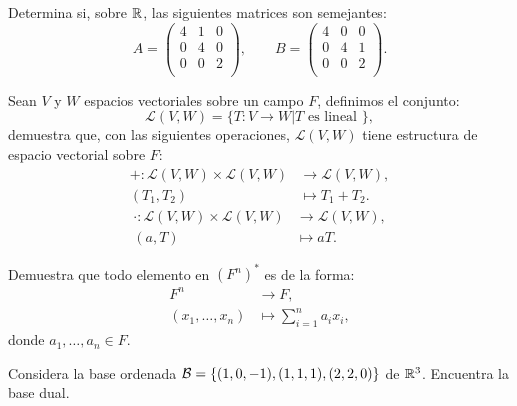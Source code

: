 \documentclass[12pt,a4paper]{book}
\newcommand{\llaves}[1]{\{#1\}}
\begin{document}
    \begin{ejercicio}
        Determina si, sobre $\mathbb{R}$, las siguientes matrices son semejantes:
        \[
        A = 
        \begin{pmatrix}
            4 & 1 & 0\\
            0 & 4 & 0\\
            0 & 0 & 2\\
        \end{pmatrix},
        \qquad
        B =
        \begin{pmatrix}
            4 & 0 & 0\\
            0 & 4 & 1\\
            0 & 0 & 2\\
        \end{pmatrix}.
        \]
    \end{ejercicio}

    \begin{ejercicio}
        Sean $V$ y $W$ espacios vectoriales sobre un campo $F$, definimos el conjunto:
        \[
        \mathcal{L}(V, W) = \llaves{T: V \to W | T \text{ es lineal }},
        \]
        demuestra que, con las siguientes operaciones, $\mathcal{L}(V, W)$ tiene estructura de  espacio vectorial sobre $F$:
        \begin{align*}
            + : \mathcal{L}(V, W) \times \mathcal{L}(V, W) & \to \mathcal{L}(V, W),\\
            (T_1, T_2) & \mapsto T_1 + T_2.
        \end{align*}
        \begin{align*}
            \cdot: \mathcal{L}(V, W) \times \mathcal{L}(V, W) & \to \mathcal{L}(V, W),\\
            (a, T) & \mapsto aT.
        \end{align*}
    \end{ejercicio} 

    \begin{ejercicio}
        Demuestra que todo elemento en $(F^n)^{\ast}$ es de la forma:
        \begin{align*}
            F^n & \to F,\\
            (x_1, \dots, x_n) & \mapsto \sum_{i = 1}^{n}a_ix_i,
        \end{align*}
        donde $a_1, \dots, a_n \in F$.
    \end{ejercicio}

    \begin{ejercicio}
        Considera la base ordenada $\BB = \llaves{(1, 0 ,-1), (1, 1, 1), (2, 2, 0)}$ de $\mathbb{R}^3$. Encuentra la base dual.
    \end{ejercicio}
\end{document}

